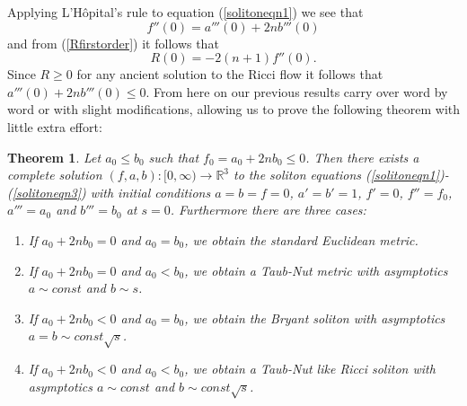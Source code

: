 \documentclass{amsart}
\newtheorem{thm}{Theorem}[section]
\theoremstyle{definition}
\theoremstyle{remark}
\numberwithin{equation}{section}
\newcommand{\R}{\mathbb{R}}  %
\begin{document}
Applying L'H\^opital's rule to equation (\ref{solitoneqn1}) we see that
\begin{equation*}
f''(0) = a'''(0) + 2nb'''(0)
\end{equation*}
and from (\ref{Rfirstorder}) it follows that 
$$R(0) = -2(n+1)f''(0).$$ 
Since $R \geq 0$ for any ancient solution to the Ricci flow it follows that $a'''(0) + 2nb'''(0) \leq 0$. From here on our previous results carry over word by word or with slight modifications, allowing us to prove the following theorem with little extra effort:

\begin{thm}
\label{r2n+2-thm}
Let $a_0 \leq b_0$ such that $f_0 = a_0 + 2n b_0 \leq 0$. Then there exists a complete solution $(f,a,b): [0,\infty) \rightarrow \R^3$ to the soliton equations (\ref{solitoneqn1})-(\ref{solitoneqn3}) with initial conditions $a=b=f=0$, $a'=b'=1$, $f'=0$, $f'' = f_0$, $a''' = a_0$ and $b''' = b_0$ at $s=0$. Furthermore there are three cases:
\begin{enumerate}
\item If $a_0 +2n b_0 = 0$ and $a_0 = b_0$, we obtain the standard Euclidean metric.
\item If $a_0 +2n b_0 = 0$ and $a_0 < b_0$, we obtain a Taub-Nut metric with asymptotics $a \sim const$ and $b \sim s$.
\item If $a_0 +2n b_0 < 0$ and $a_0 = b_0$, we obtain the Bryant soliton with asymptotics $a = b \sim const \sqrt{s}$.
\item If $a_0 +2n b_0 < 0$ and $a_0 < b_0$, we obtain a Taub-Nut like Ricci soliton with asymptotics $a \sim const$ and $b \sim const \sqrt{s}$.
\end{enumerate}
\end{thm}
\end{document}
